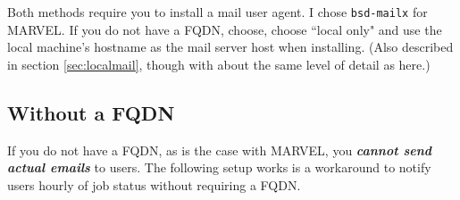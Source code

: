 Both methods require you to install a mail user agent. I chose \texttt{bsd-mailx} for MARVEL. If you do not have a FQDN, choose, choose ``local only" and use the local machine's hostname as the mail server host when installing. (Also described in section \ref{sec:localmail}, though with about the same level of detail as here.)

\subsection{Without a FQDN} \label{subsec:mail_noFQDN}

If you do not have a FQDN, as is the case with MARVEL, you \textbf{\emph{cannot send actual emails}} to users. The following setup works is a workaround to notify users hourly of job status without requiring a FQDN. 

